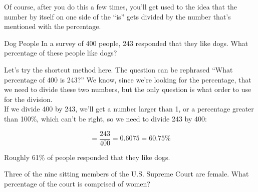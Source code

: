 Of course, after you do this a few times, you'll get used to the idea that the number by itself on one side of the ``is'' gets divided by the number that's mentioned with the percentage.

\begin{example}[https://www.youtube.com/watch?v=1GTPRROi1tE]{Dog People}
In a survey of 400 people, 243 responded that they like dogs.  What percentage of these people like dogs?

\solline

Let's try the shortcut method here.  The question can be rephrased ``What percentage of 400 is 243?''  We know, since we're looking for the percentage, that we need to divide these two numbers, but the only question is what order to use for the division.\\

If we divide 400 by 243, we'll get a number larger than 1, or a percentage greater than 100\%, which can't be right, so we need to divide 243 by 400:

\[=\dfrac{243}{400} = 0.6075 = \boxed{60.75\%}\]

Roughly 61\% of people responded that they like dogs.
\end{example}

\begin{try}
Three of the nine sitting members of the U.S. Supreme Court are female.  What percentage of the court is comprised of women?
\end{try}
\pagebreak

\text{}
\vfill

